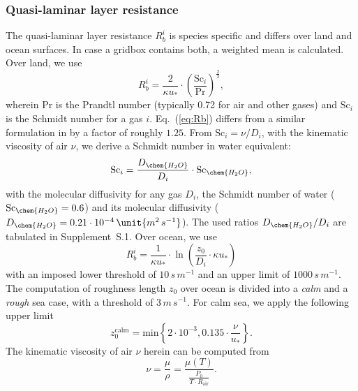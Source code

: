 \documentclass[gmd, manuscript]{copernicus}
\begin{document}
\subsubsection{Quasi-laminar layer resistance}
\label{subsubsec:Rb}
The quasi-laminar layer resistance $R_b^i$ is species specific and differs over land and ocean surfaces. In case a gridbox contains both, a weighted mean is calculated.
Over land, we use \citep[Eq.~(53),][]{ACP:Simpson2012}
\begin{equation}
  R_b^i = \frac{2}{\kappa u_*} \cdot \left(\frac{\text{Sc}_i}{\text{Pr}}\right)^{\frac{2}{3}},
  \label{eq:Rb}
\end{equation}
wherein $\text{Pr}$ is the Prandtl number (typically 0.72 for air and other gases) and $\text{Sc}_i$ is the Schmidt number for a gas $i$. Eq.~(\ref{eq:Rb}) differs from a similar formulation in \citet{ACP:Seinfeld2006} by a factor of roughly $1.25$. From $\text{Sc}_i = \nu/D_i$, with the kinematic viscosity of air $\nu$, we derive a Schmidt number in water equivalent:
\begin{equation}
  \text{Sc}_i = \frac{D_\chem{H_2O}}{D_i} \cdot \text{Sc}_\chem{H_2O},
\end{equation}
with the molecular diffusivity for any gas $D_i$, the Schmidt number of water ($\text{Sc}_\chem{H_2O}=0.6$) and its molecular diffusivity ($D_\chem{H_2O}=0.21\cdot10^{-4}\,\unit{m^2\,s^{-1}}$). The used ratios $D_\chem{H_2O}/D_i$ are tabulated in Supplement~S.1.
%
Over ocean, we use \citep[Eq.~(54),][]{ACP:Simpson2012}
\begin{equation}
  R_b^i = \frac{1}{\kappa u_*}\cdot\ln\left({\frac{z_0}{D_i}\cdot \kappa u_*}\right)
\end{equation}
with an imposed lower threshold of $10\,\unit{s\,m^{-1}}$ and an upper limit of $1000\,\unit{s\,m^{-1}}$. The computation of roughness length $z_0$ over ocean is divided into a \emph{calm} and a \emph{rough} sea case, with a threshold of $3\,\unit{m\,s^{-1}}$. For calm sea, we apply the following upper limit \citep[][with a slightly higher coefficient of $0.135$]{Hinze1975,Garratt1992}
\begin{equation}
  z_0^\text{calm} = \text{min}\left\{2\cdot10^{-3}, 0.135 \cdot \frac{\nu}{u_*}\right\}.
\end{equation}
The kinematic viscosity of air $\nu$ herein can be computed from 
\begin{equation}
  \nu = \frac{\mu}{\rho} = \frac{\mu(T)}{\frac{P_0}{T\cdot R_\text{air}}}.
  \label{eq:kinematic_viscosity}
\end{equation}
\end{document}
